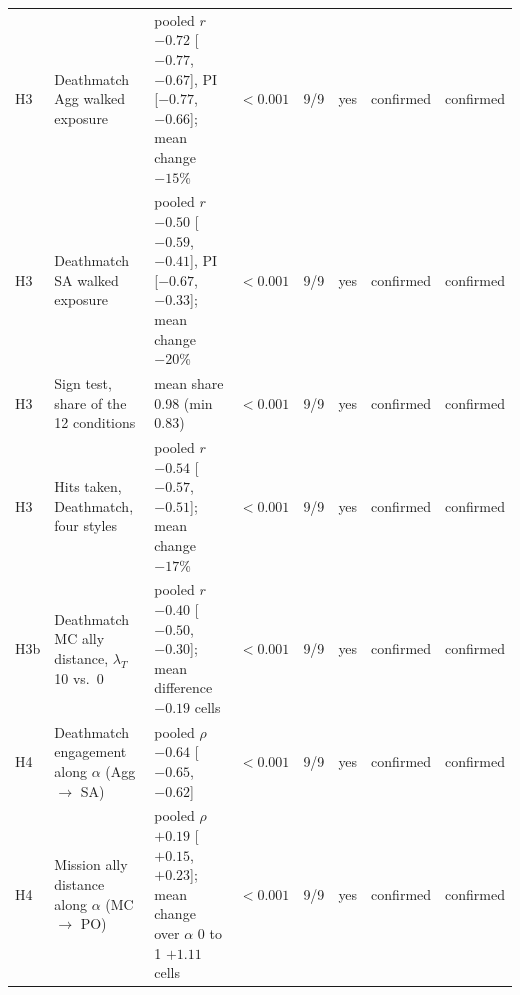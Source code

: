 \begin{tabular}{llp{}cccll}
H3 & Deathmatch Agg walked exposure & pooled $r$ $-0.72$ [$-0.77$, $-0.67$], PI [$-0.77$, $-0.66$]; mean change $-15$\% & $<0.001$ & 9/9 & yes & confirmed & confirmed \\
H3 & Deathmatch SA walked exposure & pooled $r$ $-0.50$ [$-0.59$, $-0.41$], PI [$-0.67$, $-0.33$]; mean change $-20$\% & $<0.001$ & 9/9 & yes & confirmed & confirmed \\
H3 & Sign test, share of the 12 conditions & mean share 0.98 (min 0.83) & $<0.001$ & 9/9 & yes & confirmed & confirmed \\
H3 & Hits taken, Deathmatch, four styles & pooled $r$ $-0.54$ [$-0.57$, $-0.51$]; mean change $-17$\% & $<0.001$ & 9/9 & yes & confirmed & confirmed \\
\midrule
H3b & Deathmatch MC ally distance, $\lambda_T$ 10 vs.\ 0 & pooled $r$ $-0.40$ [$-0.50$, $-0.30$]; mean difference $-0.19$ cells & $<0.001$ & 9/9 & yes & confirmed & confirmed \\
\midrule
H4 & Deathmatch engagement along $\alpha$ (Agg $\to$ SA) & pooled $\rho$ $-0.64$ [$-0.65$, $-0.62$] & $<0.001$ & 9/9 & yes & confirmed & confirmed \\
H4 & Mission ally distance along $\alpha$ (MC $\to$ PO) & pooled $\rho$ $+0.19$ [$+0.15$, $+0.23$]; mean change over $\alpha$ 0 to 1 $+1.11$ cells & $<0.001$ & 9/9 & yes & confirmed & confirmed \\
\bottomrule
\end{tabular}
